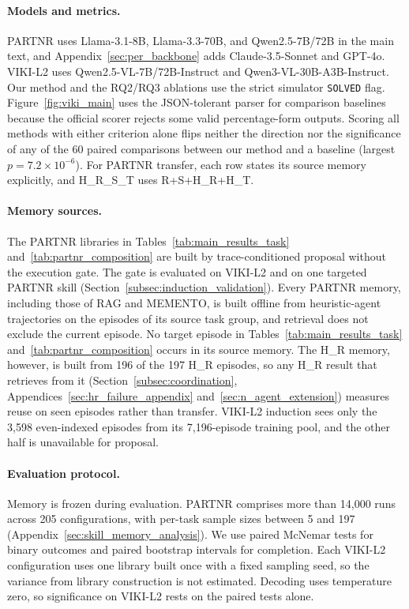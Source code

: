 \documentclass{article}
\theoremstyle{plain}
\theoremstyle{definition}
\theoremstyle{remark}
\begin{document}
\paragraph{Models and metrics.}
PARTNR uses Llama-3.1-8B, Llama-3.3-70B, and Qwen2.5-7B/72B in the main text, and Appendix~\ref{sec:per_backbone} adds Claude-3.5-Sonnet and GPT-4o. VIKI-L2 uses Qwen2.5-VL-7B/72B-Instruct and Qwen3-VL-30B-A3B-Instruct. Our method and the RQ2/RQ3 ablations use the strict simulator \texttt{SOLVED} flag. Figure~\ref{fig:viki_main} uses the JSON-tolerant parser for comparison baselines because the official scorer rejects some valid percentage-form outputs. Scoring all methods with either criterion alone flips neither the direction nor the significance of any of the 60 paired comparisons between our method and a baseline (largest $p=7.2\times10^{-6}$). For PARTNR transfer, each row states its source memory explicitly, and H\_R\_S\_T uses R+S+H\_R+H\_T.
 
\paragraph{Memory sources.}
The PARTNR libraries in Tables~\ref{tab:main_results_task} and~\ref{tab:partnr_composition} are built by trace-conditioned proposal without the execution gate. The gate is evaluated on VIKI-L2 and on one targeted PARTNR skill (Section~\ref{subsec:induction_validation}). Every PARTNR memory, including those of RAG and MEMENTO, is built offline from heuristic-agent trajectories on the episodes of its source task group, and retrieval does not exclude the current episode. No target episode in Tables~\ref{tab:main_results_task} and~\ref{tab:partnr_composition} occurs in its source memory. The H\_R memory, however, is built from 196 of the 197 H\_R episodes, so any H\_R result that retrieves from it (Section~\ref{subsec:coordination}, Appendices~\ref{sec:hr_failure_appendix} and~\ref{sec:n_agent_extension}) measures reuse on seen episodes rather than transfer. VIKI-L2 induction sees only the 3{,}598 even-indexed episodes from its 7{,}196-episode training pool, and the other half is unavailable for proposal.

\paragraph{Evaluation protocol.}
Memory is frozen during evaluation. PARTNR comprises more than 14{,}000 runs across 205 configurations, with per-task sample sizes between 5 and 197 (Appendix~\ref{sec:skill_memory_analysis}). We use paired McNemar tests for binary outcomes and paired bootstrap intervals for completion. Each VIKI-L2 configuration uses one library built once with a fixed sampling seed, so the variance from library construction is not estimated. Decoding uses temperature zero, so significance on VIKI-L2 rests on the paired tests alone.
\end{document}
